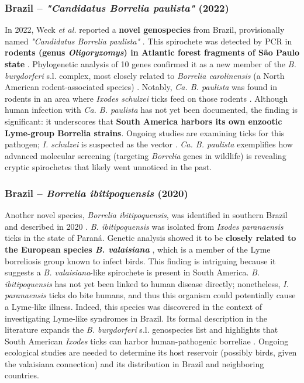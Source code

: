 \documentclass[11pt,letterpaper]{article}
\begin{document}
\subsubsection{Brazil – \textit{"Candidatus Borrelia paulista"} (2022)}
In 2022, Weck \textit{et al.} reported a \textbf{novel genospecies} from Brazil, provisionally named \textit{"Candidatus Borrelia paulista"} \citep{Weck2022}. This spirochete was detected by PCR in \textbf{rodents (genus \textit{Oligoryzomys}) in Atlantic forest fragments of São Paulo state} \citep{Weck2022a}. Phylogenetic analysis of 10 genes confirmed it as a new member of the \textit{B. burgdorferi} s.l. complex, most closely related to \textit{Borrelia carolinensis} (a North American rodent-associated species) \citep{Weck2022b, Weck2022c}. Notably, \textit{Ca. B. paulista} was found in rodents in an area where \textit{Ixodes schulzei} ticks feed on those rodents \citep{Weck2022d}. Although human infection with \textit{Ca. B. paulista} has not yet been documented, the finding is significant: it underscores that \textbf{South America harbors its own enzootic Lyme-group Borrelia strains}. Ongoing studies are examining ticks for this pathogen; \textit{I. schulzei} is suspected as the vector \citep{Weck2022e}. \textit{Ca. B. paulista} exemplifies how advanced molecular screening (targeting \textit{Borrelia} genes in wildlife) is revealing cryptic spirochetes that likely went unnoticed in the past.

\subsubsection{Brazil – \textit{Borrelia ibitipoquensis} (2020)}
Another novel species, \textit{Borrelia ibitipoquensis}, was identified in southern Brazil and described in 2020 \citep{Lucca2024e}. \textit{B. ibitipoquensis} was isolated from \textit{Ixodes paranaensis} ticks in the state of Paraná. Genetic analysis showed it to be \textbf{closely related to the European species \textit{B. valaisiana}} \citep{Lucca2024f}, which is a member of the Lyme borreliosis group known to infect birds. This finding is intriguing because it suggests a \textit{B. valaisiana}-like spirochete is present in South America. \textit{B. ibitipoquensis} has not yet been linked to human disease directly; nonetheless, \textit{I. paranaensis} ticks do bite humans, and thus this organism could potentially cause a Lyme-like illness. Indeed, this species was discovered in the context of investigating Lyme-like syndromes in Brazil. Its formal description in the literature expands the \textit{B. burgdorferi} s.l. genospecies list and highlights that South American \textit{Ixodes} ticks can harbor human-pathogenic borreliae \citep{Lucca2024g}. Ongoing ecological studies are needed to determine its host reservoir (possibly birds, given the valaisiana connection) and its distribution in Brazil and neighboring countries.
\end{document}
